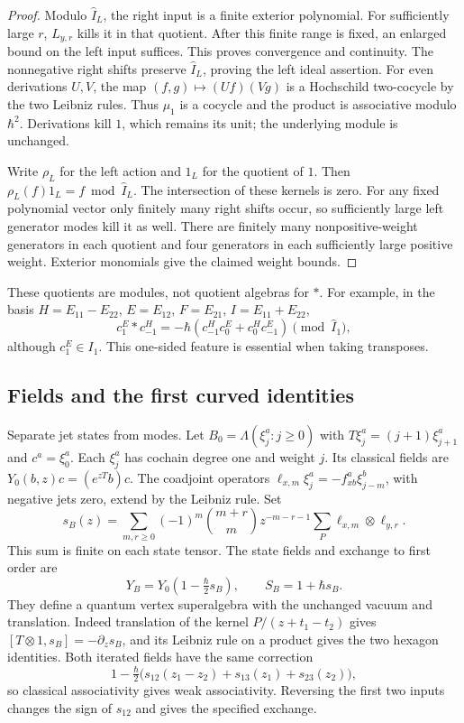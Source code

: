 \begin{proof}
Modulo $\widehat I_L$, the right input is a finite exterior polynomial.
For sufficiently large $r$, $L_{y,r}$ kills it in that quotient.
After this finite range is fixed, an enlarged bound on the left input
suffices.  This proves convergence and continuity.  The nonnegative
right shifts preserve $\widehat I_L$, proving the left ideal assertion.
For even derivations $U,V$, the map $(f,g)\mapsto(Uf)(Vg)$ is a
Hochschild two-cocycle by the two Leibniz rules.  Thus $\mu_1$ is a
cocycle and the product is associative modulo $\hbar^2$.  Derivations
kill $1$, which remains its unit; the underlying module is unchanged.

Write $\rho_L$ for the left action and $1_L$ for the quotient of $1$.
Then
$\rho_L(f)1_L=f\bmod\widehat I_L$.  The intersection of these
kernels is zero.  For any fixed polynomial vector only finitely many
right shifts occur, so sufficiently large left generator modes kill
it as well.  There are finitely many nonpositive-weight generators in
each quotient and four generators in each sufficiently large positive
weight.  Exterior monomials give the claimed weight bounds.
\end{proof}

These quotients are modules, not quotient algebras for $*$.  For example,
in the basis $H=E_{11}-E_{22}$, $E=E_{12}$, $F=E_{21}$, $I=E_{11}+E_{22}$,
\[
 c_1^E*c_{-1}^H
 =-\hbar(c_{-1}^Hc_0^E+c_0^Hc_{-1}^E)
                 \pmod{\widehat I_1},
\]
although $c_1^E\in I_1$.  This one-sided feature is essential when
taking transposes.

\subsection{Fields and the first curved identities}

Separate jet states from modes.  Let
$B_0=\Lambda(\xi_j^a:j\geq0)$ with
$T\xi_j^a=(j+1)\xi_{j+1}^a$ and $c^a=\xi_0^a$.
Each $\xi_j^a$ has cochain degree one and weight $j$.
Its classical fields are $Y_0(b,z)c=(e^{zT}b)c$.
The coadjoint operators
$\ell_{x,m}\xi_j^a=-f_{xb}^a\xi_{j-m}^b$, with negative jets zero,
extend by the Leibniz rule.  Set
\begin{equation}\label{cyquant:eq:ghost-exchange}
 s_B(z)=\sum_{m,r\geq0}(-1)^m\binom{m+r}{m}z^{-m-r-1}
                     \sum_P\ell_{x,m}\otimes\ell_{y,r}.
\end{equation}
This sum is finite on each state tensor.  The state fields and exchange
to first order are
\[
 Y_B=Y_0(1-\tfrac\hbar2s_B),\qquad S_B=1+\hbar s_B.
\]
They define a quantum vertex superalgebra with the unchanged vacuum
and translation.  Indeed translation of the kernel
$P/(z+t_1-t_2)$ gives $[T\otimes1,s_B]=-\partial_zs_B$,
and its Leibniz rule on a product gives the two hexagon identities.
Both iterated fields have the same correction
\[
 1-\tfrac\hbar2
       \bigl(s_{12}(z_1-z_2)+s_{13}(z_1)+s_{23}(z_2)\bigr),
\]
so classical associativity gives weak associativity.  Reversing the
first two inputs changes the sign of $s_{12}$ and gives the specified
exchange.

